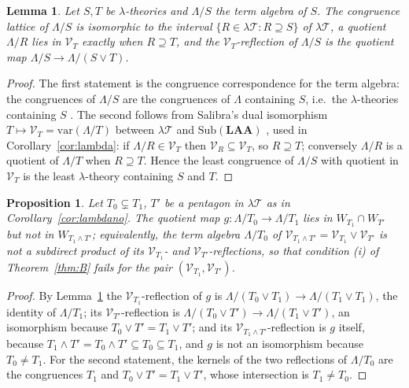 \documentclass[11pt]{amsart}
\newtheorem{lem}[thm]{Lemma}
\newtheorem{prop}[thm]{Proposition}
\theoremstyle{definition}
\newcommand{\Sub}{\mathrm{Sub}}
\newcommand{\sV}{\mathcal V}
\newcommand{\lT}{\lambda\mathcal T}
\newcommand{\var}{\mathrm{var}}
\begin{document}
\begin{lem}\label{lem:termalg}
Let $S,T$ be $\lambda$-theories and $\Lambda/S$ the term algebra of $S$. The
congruence lattice of $\Lambda/S$ is isomorphic to the interval
$\{R\in\lT:R\supseteq S\}$ of $\lT$, a quotient $\Lambda/R$ lies in $\sV_T$
exactly when $R\supseteq T$, and the $\sV_T$-reflection of $\Lambda/S$ is the
quotient map $\Lambda/S\to\Lambda/(S\vee T)$.
\end{lem}
\begin{proof}
The first statement is the congruence correspondence for the term algebra:
the congruences of $\Lambda/S$ are the congruences of $\Lambda$ containing
$S$, i.e.\ the $\lambda$-theories containing $S$ \cite{Salibra00,LS04}. The
second follows from Salibra's dual isomorphism
$T\mapsto\sV_T=\var(\Lambda/T)$ between $\lT$ and $\Sub(\mathbf{LAA})$
\cite{Salibra00}, used in Corollary~\ref{cor:lambda}: if $\Lambda/R\in\sV_T$
then $\sV_R\subseteq\sV_T$, so $R\supseteq T$; conversely $\Lambda/R$ is a
quotient of $\Lambda/T$ when $R\supseteq T$. Hence the
least congruence of $\Lambda/S$ with quotient in $\sV_T$ is the least
$\lambda$-theory containing $S$ and $T$.
\end{proof}

\begin{prop}\label{prop:explicit}
Let $T_0\subsetneq T_1$, $T'$ be a pentagon in $\lT$ as in
Corollary~\ref{cor:lambdano}. The quotient map
$g\colon\Lambda/T_0\to\Lambda/T_1$ lies in $W_{T_1}\cap W_{T'}$ but not in
$W_{T_1\wedge T'}$; equivalently, the term algebra $\Lambda/T_0$ of
$\sV_{T_1\wedge T'}=\sV_{T_1}\vee\sV_{T'}$ is not a subdirect product of its
$\sV_{T_1}$- and $\sV_{T'}$-reflections, so that condition (i) of
Theorem~\ref{thm:B} fails for the pair $(\sV_{T_1},\sV_{T'})$.
\end{prop}
\begin{proof}
By Lemma~\ref{lem:termalg} the $\sV_{T_1}$-reflection of $g$ is
$\Lambda/(T_0\vee T_1)\to\Lambda/(T_1\vee T_1)$, the identity of
$\Lambda/T_1$; its $\sV_{T'}$-reflection is
$\Lambda/(T_0\vee T')\to\Lambda/(T_1\vee T')$, an isomorphism because
$T_0\vee T'=T_1\vee T'$; and its $\sV_{T_1\wedge T'}$-reflection is $g$
itself, because $T_1\wedge T'=T_0\wedge T'\subseteq T_0\subseteq T_1$, and
$g$ is not an isomorphism because $T_0\ne T_1$. For the second statement, the
kernels of the two reflections of $\Lambda/T_0$ are the congruences $T_1$ and
$T_0\vee T'=T_1\vee T'$, whose intersection is $T_1\ne T_0$.
\end{proof}
\end{document}
